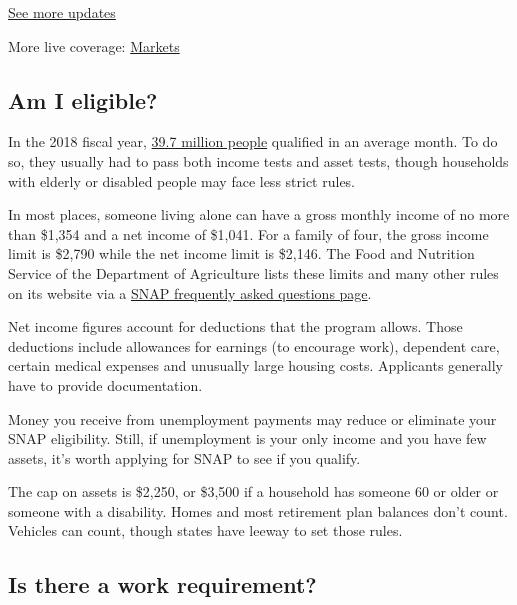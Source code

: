 \href{https://www.nytimes3xbfgragh.onion/2020/08/20/world/coronavirus-covid.html?action=click\&pgtype=Article\&state=default\&region=MAIN_CONTENT_1\&context=storylines_live_updates}{See
more updates}

More live coverage:
\href{https://www.nytimes3xbfgragh.onion/live/2020/08/20/business/stock-market-today-coronavirus?action=click\&pgtype=Article\&state=default\&region=MAIN_CONTENT_1\&context=storylines_live_updates}{Markets}

\hypertarget{am-i-eligible}{%
\subsection{Am I eligible?}\label{am-i-eligible}}

In the 2018 fiscal year,
\href{https://fns-prod.azureedge.net/sites/default/files/resource-files/Characteristics2018-Summary.pdf}{39.7
million people} qualified in an average month. To do so, they usually
had to pass both income tests and asset tests, though households with
elderly or disabled people may face less strict rules.

In most places, someone living alone can have a gross monthly income of
no more than \$1,354 and a net income of \$1,041. For a family of four,
the gross income limit is \$2,790 while the net income limit is \$2,146.
The Food and Nutrition Service of the Department of Agriculture lists
these limits and many other rules on its website via a
\href{https://www.fns.usda.gov/snap/recipient/eligibility}{SNAP
frequently asked questions page}.

Net income figures account for deductions that the program allows. Those
deductions include allowances for earnings (to encourage work),
dependent care, certain medical expenses and unusually large housing
costs. Applicants generally have to provide documentation.

Money you receive from unemployment payments may reduce or eliminate
your SNAP eligibility. Still, if unemployment is your only income and
you have few assets, it's worth applying for SNAP to see if you qualify.

The cap on assets is \$2,250, or \$3,500 if a household has someone 60
or older or someone with a disability. Homes and most retirement plan
balances don't count. Vehicles can count, though states have leeway to
set those rules.

\hypertarget{is-there-a-work-requirement}{%
\subsection{Is there a work
requirement?}\label{is-there-a-work-requirement}}

